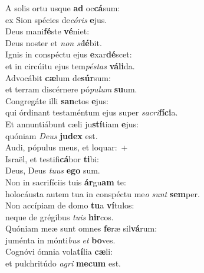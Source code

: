 \evenverse A solis ortu usque \textbf{ad} oc\textbf{cá}sum:~\*\\
\evenverse ex Sion spécies de\textit{có}\textit{ris} \textbf{e}jus.\\
\oddverse Deus mani\textbf{fé}ste \textbf{vé}niet:~\*\\
\oddverse Deus noster et \textit{non} \textit{si}\textbf{lé}bit.\\
\evenverse Ignis in conspéctu ejus \textbf{e}xar\textbf{dé}scet:~\*\\
\evenverse et in circúitu ejus tem\textit{pé}\textit{stas} \textbf{vá}\textbf{li}da.\\
\oddverse Advocábit \textbf{cæ}lum de\textbf{súr}sum:~\*\\
\oddverse et terram discérnere pó\textit{pu}\textit{lum} \textbf{su}um.\\
\evenverse Congregáte illi \textbf{san}ctos \textbf{e}jus:~\*\\
\evenverse qui órdinant testaméntum ejus super \textit{sa}\textit{cri}\textbf{fí}\textbf{ci}a.\\
\oddverse Et annuntiábunt cæli ju\textbf{stí}tiam \textbf{e}jus:~\*\\
\oddverse quóniam \textit{De}\textit{us} \textbf{ju}\textbf{dex} est.\\
\evenverse Audi, pópulus meus, et loquar:~+\\
\evenverse  Israël, et testifi\textbf{cá}bor \textbf{ti}bi:~\*\\
\evenverse Deus, Deus \textit{tu}\textit{us} \textbf{e}\textbf{go} sum.\\
\oddverse Non in sacrifíciis tuis \textbf{ár}gu\textbf{am} te:~\*\\
\oddverse holocáusta autem tua in conspéctu me\textit{o} \textit{sunt} \textbf{sem}per.\\
\evenverse Non accípiam de domo \textbf{tu}a \textbf{ví}tulos:~\*\\
\evenverse neque de grégibus \textit{tu}\textit{is} \textbf{hir}cos.\\
\oddverse Quóniam meæ sunt omnes \textbf{fe}ræ sil\textbf{vá}rum:~\*\\
\oddverse juménta in mónti\textit{bus} \textit{et} \textbf{bo}ves.\\
\evenverse Cognóvi ómnia vola\textbf{tí}lia \textbf{cæ}li:~\*\\
\evenverse et pulchritúdo \textit{a}\textit{gri} \textbf{me}\textbf{cum} est.\\
